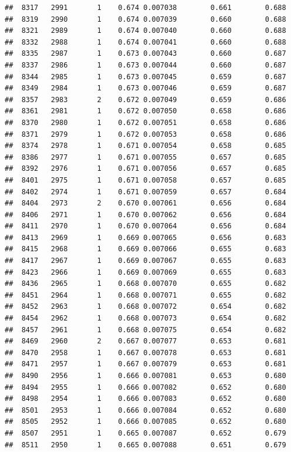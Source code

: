 \documentclass[
]{book}
\begin{document}
\begin{verbatim}
##  8317   2991       1    0.674 0.007038        0.661        0.688
##  8319   2990       1    0.674 0.007039        0.660        0.688
##  8321   2989       1    0.674 0.007040        0.660        0.688
##  8332   2988       1    0.674 0.007041        0.660        0.688
##  8335   2987       1    0.673 0.007043        0.660        0.687
##  8337   2986       1    0.673 0.007044        0.660        0.687
##  8344   2985       1    0.673 0.007045        0.659        0.687
##  8349   2984       1    0.673 0.007046        0.659        0.687
##  8357   2983       2    0.672 0.007049        0.659        0.686
##  8361   2981       1    0.672 0.007050        0.658        0.686
##  8370   2980       1    0.672 0.007051        0.658        0.686
##  8371   2979       1    0.672 0.007053        0.658        0.686
##  8374   2978       1    0.671 0.007054        0.658        0.685
##  8386   2977       1    0.671 0.007055        0.657        0.685
##  8392   2976       1    0.671 0.007056        0.657        0.685
##  8401   2975       1    0.671 0.007058        0.657        0.685
##  8402   2974       1    0.671 0.007059        0.657        0.684
##  8404   2973       2    0.670 0.007061        0.656        0.684
##  8406   2971       1    0.670 0.007062        0.656        0.684
##  8411   2970       1    0.670 0.007064        0.656        0.684
##  8413   2969       1    0.669 0.007065        0.656        0.683
##  8415   2968       1    0.669 0.007066        0.655        0.683
##  8417   2967       1    0.669 0.007067        0.655        0.683
##  8423   2966       1    0.669 0.007069        0.655        0.683
##  8436   2965       1    0.668 0.007070        0.655        0.682
##  8451   2964       1    0.668 0.007071        0.655        0.682
##  8452   2963       1    0.668 0.007072        0.654        0.682
##  8454   2962       1    0.668 0.007073        0.654        0.682
##  8457   2961       1    0.668 0.007075        0.654        0.682
##  8469   2960       2    0.667 0.007077        0.653        0.681
##  8470   2958       1    0.667 0.007078        0.653        0.681
##  8471   2957       1    0.667 0.007079        0.653        0.681
##  8490   2956       1    0.666 0.007081        0.653        0.680
##  8494   2955       1    0.666 0.007082        0.652        0.680
##  8498   2954       1    0.666 0.007083        0.652        0.680
##  8501   2953       1    0.666 0.007084        0.652        0.680
##  8505   2952       1    0.666 0.007085        0.652        0.680
##  8507   2951       1    0.665 0.007087        0.652        0.679
##  8511   2950       1    0.665 0.007088        0.651        0.679

\end{verbatim}
\end{document}
